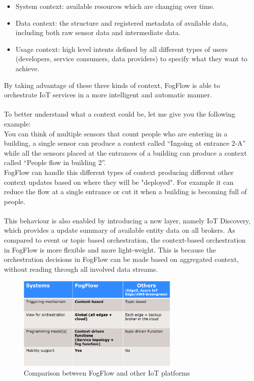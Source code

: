 \documentclass[a4paper]{article}
\begin{document}
\begin{itemize}
    \item System context: available resources which are changing over time.
    \item Data context: the structure and registered metadata of available data, including both raw sensor data and intermediate data.
    \item Usage context: high level intents defined by all different types of users (developers, service consumers, data providers) to specify what they want to achieve.
\end{itemize}
By taking advantage of these three kinds of context, FogFlow is able to orchestrate IoT services in a more intelligent and automatic manner.\\\\
To better understand what a context could be, let me give you the following example:\\
You can think of multiple sensors that count people who are entering in a building, a single sensor can produce a context called “Ingoing at entrance 2-A” while all the sensors placed at the entrances of a building can produce a context called “People flow in building 2”.\\
FogFlow can handle this different types of context producing different other context updates based on where they will be "deployed". For example it can reduce the flow at a single entrance or cut it when a building is becoming full of people.\\\\
This behaviour is also enabled by introducing a new layer, namely IoT Discovery, which provides a update summary of available entity data on all brokers. As compared to event or topic based orchestration, the context-based orchestration in FogFlow is more flexible and more light-weight. This is because the orchestration decisions in FogFlow can be made based on aggregated context, without reading through all involved data streams.
\begin{figure}[H]
    \centering
    \includegraphics[width=0.7\textwidth]{Images/comparison.png}
    \caption{Comparison between FogFlow and other IoT platforms}
\end{figure}{}
\end{document}
